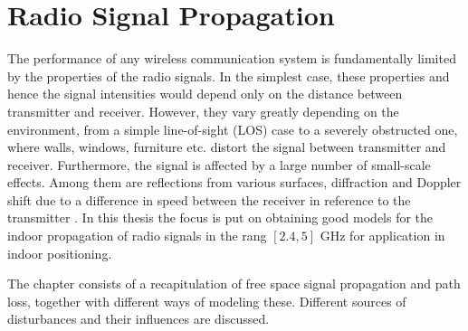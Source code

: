 \documentclass{LTHthesis}
\begin{document}
\chapter{Radio Signal Propagation}
%
\label{chap:RSP}
%
The performance of any wireless communication system is fundamentally limited by the properties of the radio signals. In the simplest case, these properties and hence the signal intensities would depend only on the distance between transmitter and receiver. However, they vary greatly depending on the environment, from a simple line-of-sight (LOS) case to a severely obstructed one, where walls, windows, furniture etc. distort the signal between transmitter and receiver. Furthermore, the signal is affected by a large number of small-scale effects. Among them are reflections from various surfaces, diffraction and Doppler shift due to a difference in speed between the receiver in reference to the transmitter \cite{rappaport96}. In this thesis the focus is put on obtaining good models for the indoor propagation of radio signals in the rang $[2.4,5]$ GHz for application in indoor positioning.

The chapter consists of a recapitulation of free space signal propagation and path loss, together with different ways of modeling these. Different sources of disturbances and their influences are discussed.
%
\end{document}
